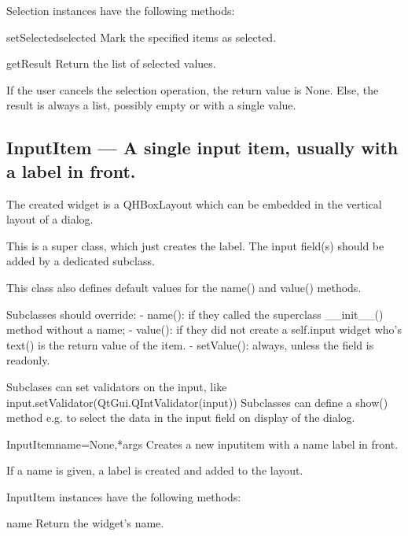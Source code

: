 Selection instances have the following methods:

\begin{funcdesc}{setSelected}{selected}
Mark the specified items as selected.
\end{funcdesc}

\begin{funcdesc}{getResult}{}
Return the list of selected values.

        If the user cancels the selection operation, the return value is None.
        Else, the result is always a list, possibly empty or with a single
        value.
        
\end{funcdesc}

\subsection{InputItem --- A single input item, usually with a label in front.}
    The created widget is a QHBoxLayout which can be embedded in the vertical
    layout of a dialog.
    
    This is a super class, which just creates the label. The input
    field(s) should be added by a dedicated subclass.

    This class also defines default values for the name() and value()
    methods.

    Subclasses should override:
    - name(): if they called the superclass __init__() method without a name;
    - value(): if they did not create a self.input widget who's text() is
      the return value of the item.
    - setValue(): always, unless the field is readonly.

    Subclases can set validators on the input, like
      input.setValidator(QtGui.QIntValidator(input))
    Subclasses can define a show() method e.g. to select the data in the
    input field on display of the dialog.
    

\begin{classdesc}{InputItem}{name=None,*args}
Creates a new inputitem with a name label in front.
        
        If a name is given, a label is created and added to the layout.
        
\end{classdesc}

InputItem instances have the following methods:

\begin{funcdesc}{name}{}
Return the widget's name.
\end{funcdesc}

